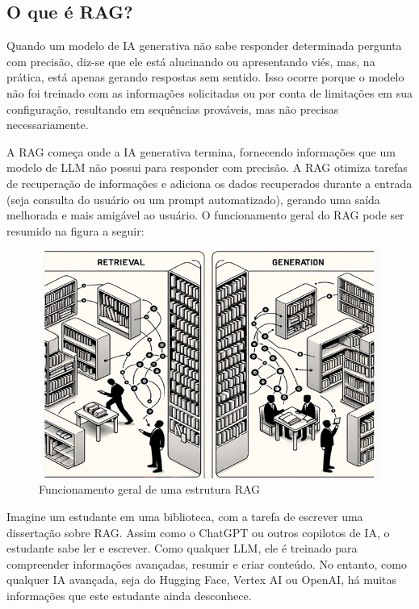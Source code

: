 \documentclass[a4paper, 12pt]{article}
\begin{document}
    \subsection{O que é RAG?}
    
    Quando um modelo de IA generativa não sabe responder determinada pergunta com precisão, diz-se que ele está alucinando ou apresentando viés, mas, na prática, está apenas gerando respostas sem sentido. Isso ocorre porque o modelo não foi treinado com as informações solicitadas ou por conta de limitações em sua configuração, resultando em sequências prováveis, mas não precisas necessariamente.

    A RAG começa onde a IA generativa termina, fornecendo informações que um modelo de LLM não possui para responder com precisão. A RAG otimiza tarefas de recuperação de informações e adiciona os dados recuperados durante a entrada (seja consulta do usuário ou um prompt automatizado), gerando uma saída melhorada e mais amigável ao usuário. O funcionamento geral do RAG pode ser resumido na figura a seguir:

    \begin{figure}[h]
        \includegraphics{retrieval-generation.png}
        \centering
        \caption{Funcionamento geral de uma estrutura RAG}
        \centering
    \end{figure}

    Imagine um estudante em uma biblioteca, com a tarefa de escrever uma dissertação sobre RAG. Assim como o ChatGPT ou outros copilotos de IA, o estudante sabe ler e escrever. Como qualquer LLM, ele é treinado para compreender informações avançadas, resumir e criar conteúdo. No entanto, como qualquer IA avançada, seja do Hugging Face, Vertex AI ou OpenAI, há muitas informações que este estudante ainda desconhece.
\end{document}
